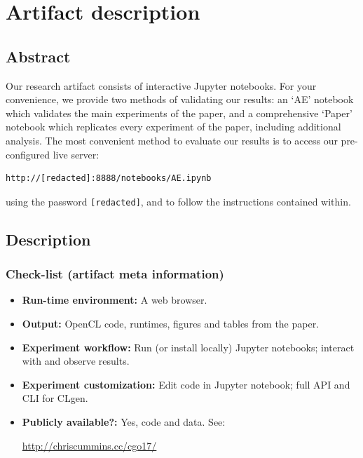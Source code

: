 \appendix

\section{Artifact description}

\subsection{Abstract}

Our research artifact consists of interactive Jupyter notebooks. For your convenience, we provide two methods of validating our results: an `AE' notebook which validates the main experiments of the paper, and a comprehensive `Paper' notebook which replicates every experiment of the paper, including additional analysis. The most convenient method to evaluate our results is to access our pre-configured live server:
\begin{verbatim}
http://[redacted]:8888/notebooks/AE.ipynb
\end{verbatim}
using the password \texttt{[redacted]}, and to follow the instructions contained within.

\subsection{Description}

\subsubsection{Check-list (artifact meta information)}

{\small
  \begin{itemize}
    \item {\bf Run-time environment: }A web browser.%
    \item {\bf Output: }OpenCL code, runtimes, figures and tables from the paper.
    \item {\bf Experiment workflow: }Run (or install locally) Jupyter notebooks; interact with and observe results.
    \item {\bf Experiment customization: }Edit code in Jupyter notebook; full API and CLI for CLgen.
    \item {\bf Publicly available?: }Yes, code and data. See:
    
    \url{http://chriscummins.cc/cgo17/}
  \end{itemize}
}

